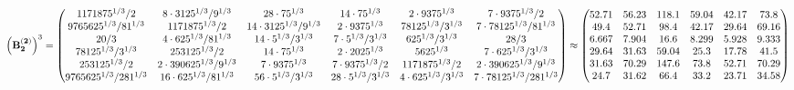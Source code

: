 \documentclass[10pt,a4paper]{article}
\begin{document}
	\[
		\left(\bold{B_2^{(2)}}\right)^{3} = 
		\begin{pmatrix}
			{{1171875^ {1 / 3}}} / {{2}} & {{8} \cdot {3125^ {1 / 3}}} / {{9^ {1 / 3}}} & {{28} \cdot {75^ {1 / 3}}}{} & {{14} \cdot {75^ {1 / 3}}}{} & {{2} \cdot {9375^ {1 / 3}}}{} & {{7} \cdot {9375^ {1 / 3}}} / {{2}} \\
			{{9765625^ {1 / 3}}} / {{81^ {1 / 3}}} & {{1171875^ {1 / 3}}} / {{2}} & {{14} \cdot {3125^ {1 / 3}}} / {{9^ {1 / 3}}} & {{2} \cdot {9375^ {1 / 3}}}{} & {{78125^ {1 / 3}}} / {{3^ {1 / 3}}} & {{7} \cdot {78125^ {1 / 3}}} / {{81^ {1 / 3}}} \\
			{{20}} / {{3}} & {{4} \cdot {625^ {1 / 3}}} / {{81^ {1 / 3}}} & {{14} \cdot {5^ {1 / 3}}} / {{3^ {1 / 3}}} & {{7} \cdot {5^ {1 / 3}}} / {{3^ {1 / 3}}} & {{625^ {1 / 3}}} / {{3^ {1 / 3}}} & {{28}} / {{3}} \\
			{{78125^ {1 / 3}}} / {{3^ {1 / 3}}} & {{253125^ {1 / 3}}} / {{2}} & {{14} \cdot {75^ {1 / 3}}}{} & {{2} \cdot {2025^ {1 / 3}}}{} & {{5625^ {1 / 3}}}{} & {{7} \cdot {625^ {1 / 3}}} / {{3^ {1 / 3}}} \\
			{{253125^ {1 / 3}}} / {{2}} & {{2} \cdot {390625^ {1 / 3}}} / {{9^ {1 / 3}}} & {{7} \cdot {9375^ {1 / 3}}}{} & {{7} \cdot {9375^ {1 / 3}}} / {{2}} & {{1171875^ {1 / 3}}} / {{2}} & {{2} \cdot {390625^ {1 / 3}}} / {{9^ {1 / 3}}} \\
			{{9765625^ {1 / 3}}} / {{2}{81^ {1 / 3}}} & {{16} \cdot {625^ {1 / 3}}} / {{81^ {1 / 3}}} & {{56} \cdot {5^ {1 / 3}}} / {{3^ {1 / 3}}} & {{28} \cdot {5^ {1 / 3}}} / {{3^ {1 / 3}}} & {{4} \cdot {625^ {1 / 3}}} / {{3^ {1 / 3}}} & {{7} \cdot {78125^ {1 / 3}}} / {{2}{81^ {1 / 3}}} \\
		\end{pmatrix}
		\approx
		\begin{pmatrix}
			52.71    & 56.23    & 118.1    & 59.04    & 42.17    & 73.8     \\
			49.4     & 52.71    & 98.4     & 42.17    & 29.64    & 69.16    \\
			6.667    & 7.904    & 16.6     & 8.299    & 5.928    & 9.333    \\
			29.64    & 31.63    & 59.04    & 25.3     & 17.78    & 41.5     \\
			31.63    & 70.29    & 147.6    & 73.8     & 52.71    & 70.29    \\
			24.7     & 31.62    & 66.4     & 33.2     & 23.71    & 34.58    \\
		\end{pmatrix}
	\]
\end{document}

